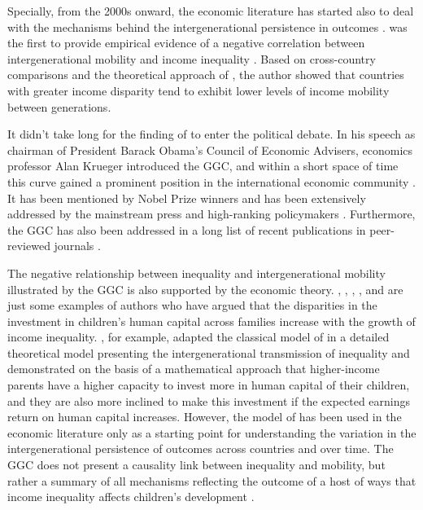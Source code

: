 \documentclass[a4paper, 12pt]{article}
\begin{document}
Specially, from the 2000s onward, the economic literature has started also to deal with the mechanisms behind the intergenerational persistence in outcomes \citep{black2010recent, rothwell2015geographic}. \citet {corak2006poor} was the first to provide empirical evidence of a negative correlation between intergenerational mobility and income inequality \citep{kearney2014income}. Based on cross-country comparisons and the theoretical approach of \citet{Solon2004}, the author showed that countries with greater income disparity tend to exhibit lower levels of income mobility between generations.


It didn't take long for the finding of \citet{corak2006poor} to enter the political debate. In his speech as chairman of President Barack Obama's Council of Economic Advisers, economics professor Alan Krueger \citeyearpar{krueger2012rise} introduced the GGC, and within a short space of time this curve gained a prominent position in the international economic community \citep{jerrim2015income}. It has been mentioned by Nobel Prize winners \citep[see for example][] {heckman2013economics} and has been extensively addressed by the mainstream press \citep[see for example][] {churchwell2012great, economist2013} and high-ranking policymakers \citep[see for example][] {obama2013full,whitehouse2013}. Furthermore, the GGC has also been addressed in a long list of recent publications in peer-reviewed journals \citep [see for example][] {corak2013income, chetty2014land, boudreaux2014jumping, lefgren2015beyond, jerrim2015income, brahim2016inequality, guell2018correlating, neidhofer2019intergenerational}.




The negative relationship between inequality and intergenerational mobility illustrated by the GGC is also supported by the economic theory. \citet{Becker&Tomes1986}, \citet{Solon2004}, \citet{breen2005inequality}, \citet{duncan2011whither}, and \citet{corak2013income} are just some examples of authors who have argued that the disparities in the investment in children’s human capital across families increase with the growth of income inequality. \citet{Solon2004}, for example, adapted the classical model of \citet{Becker&Tomes1979, Becker&Tomes1986} in a detailed theoretical model presenting the intergenerational transmission of inequality and demonstrated on the basis of a mathematical approach that higher-income parents have a higher capacity to invest more in human capital of their children, and they are also more inclined to make this investment if the expected earnings return on human capital increases. However, the model of \citet{Solon2004} has been used in the economic literature only as a starting point for understanding the variation in the intergenerational persistence of outcomes across countries and over time. The GGC does not present a causality link between inequality and mobility, but rather a summary of all mechanisms reflecting the outcome of a host of ways that income inequality affects children’s development \citep{corak2013income,kearney2014income}. 
\end{document}
